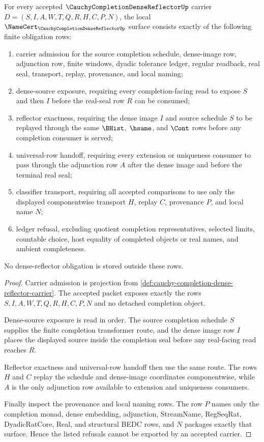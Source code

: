 \begin{theorem}
\label{thm:cauchy-completion-dense-reflector-namecert-obligations}
For every accepted $\CauchyCompletionDenseReflectorUp$ carrier $D=(S,I,A,W,T,Q,R,H,C,P,N)$, the local $\NameCert_{\CauchyCompletionDenseReflectorUp}$ surface consists exactly of the following finite obligation rows:
\begin{enumerate}
\item carrier admission for the source completion schedule, dense-image row, adjunction row, finite windows, dyadic tolerance ledger, regular readback, real seal, transport, replay, provenance, and local naming;
\item dense-source exposure, requiring every completion-facing read to expose $S$ and then $I$ before the real-seal row $R$ can be consumed;
\item reflector exactness, requiring the dense image $I$ and source schedule $S$ to be replayed through the same $\BHist$, $\hsame$, and $\Cont$ rows before any completion consumer is served;
\item universal-row handoff, requiring every extension or uniqueness consumer to pass through the adjunction row $A$ after the dense image and before the terminal real seal;
\item classifier transport, requiring all accepted comparisons to use only the displayed componentwise transport $H$, replay $C$, provenance $P$, and local name $N$;
\item ledger refusal, excluding quotient completion representatives, selected limits, countable choice, host equality of completed objects or real names, and ambient completeness.
\end{enumerate}
No dense-reflector obligation is stored outside these rows.
\end{theorem}
\begin{proof}
Carrier admission is projection from \autoref{def:cauchy-completion-dense-reflector-carrier}. The accepted packet exposes exactly the rows $S,I,A,W,T,Q,R,H,C,P,N$ and no detached completion object.

Dense-source exposure is read in order. The source completion schedule $S$ supplies the finite completion transformer route, and the dense image row $I$ places the displayed source inside the completion seal before any real-facing read reaches $R$.

Reflector exactness and universal-row handoff then use the same route. The rows $H$ and $C$ replay the schedule and dense-image coordinates componentwise, while $A$ is the only adjunction row available to extension and uniqueness consumers.

Finally inspect the provenance and local naming rows. The row $P$ names only the completion monad, dense embedding, adjunction, StreamName, RegSeqRat, DyadicRatCore, Real, and structural BEDC rows, and $N$ packages exactly that surface. Hence the listed refusals cannot be exported by an accepted carrier.
\end{proof}

